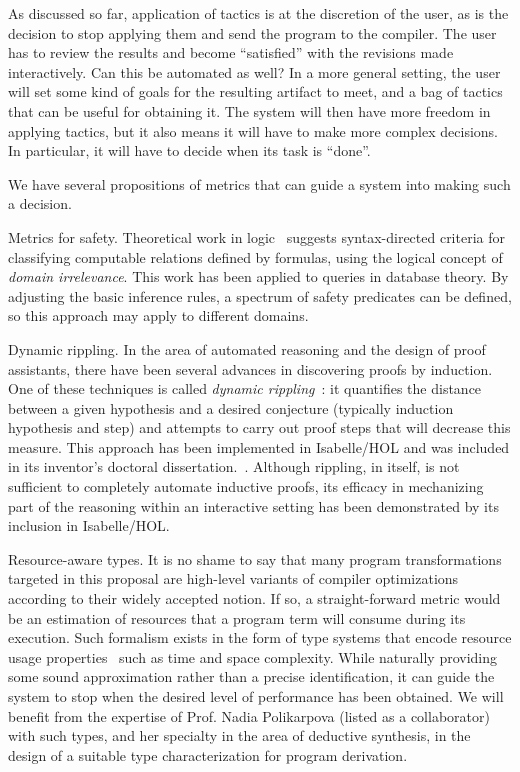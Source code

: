 As discussed so far, application of tactics is at the discretion of the
user, as is the decision to stop applying them and send the program to
the compiler.
The user has to review the results and become ``satisfied'' with the revisions made interactively.
Can this be automated as well?
In a more general setting, the user will set some kind of goals for the
resulting artifact to meet, and a bag of tactics that can be useful for
obtaining it.
The system will then have more freedom in applying tactics, but it also
means it will have to make more complex decisions.
In particular, it will have to decide when its task is ``done''.

We have several propositions of metrics that can guide a system into
making such a decision.

\begin{paragraph}{Metrics for safety.} 
Theoretical work in logic~\cite{MLCS1994/Avron} suggests syntax-directed
criteria for classifying computable relations defined by formulas,
using the logical concept of \emph{domain irrelevance}.
This work has been applied to queries in database theory.
By adjusting the basic inference rules, a spectrum of safety predicates can
be defined, so this approach may apply to different domains.
\end{paragraph}

\begin{paragraph}{Dynamic rippling.}
In the area of automated reasoning and the design of proof assistants,
there have been several advances in discovering proofs by induction.
One of these techniques is called \emph{dynamic rippling}~\cite{Festschrift2017/JohanssonDB10}:
it quantifies the distance between a given hypothesis and a desired conjecture
(typically induction hypothesis and step) and attempts to carry out proof
steps that will decrease this measure.
This approach has been implemented in Isabelle/HOL and was included in
its inventor's doctoral dissertation.~\cite{Thesis2009/Johansson}.
Although rippling, in itself, is not sufficient to completely automate
inductive proofs, its efficacy in mechanizing part of the reasoning
within an interactive setting has been demonstrated by its inclusion
in Isabelle/HOL.
\end{paragraph}

\begin{paragraph}{Resource-aware types.}
It is no shame to say that many program transformations targeted in this
proposal are high-level variants of compiler optimizations according to their widely
accepted notion.
If so, a straight-forward metric would be an estimation of resources
that a program term will consume during its execution.
Such formalism exists in the form of type systems that encode resource
usage properties~\cite{CAV2012/Hoffman} such as time and space complexity.
While naturally providing some sound approximation rather than a precise
identification, it can guide the system to stop when the desired level
of performance has been obtained.
We will benefit from the expertise of Prof. Nadia Polikarpova (listed as a collaborator) with such types, 
and her specialty in the area of deductive synthesis, in the design of a suitable type characterization for program derivation.
\end{paragraph}

